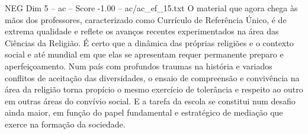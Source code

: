 \begin{textsample}{NEG Dim 5 – ac – Score -1.00 – ac/ac\_ef\_15.txt}
O material que agora chega às mãos dos professores, caracterizado como Currículo de Referência Único, é de extrema qualidade e reflete os avanços recentes experimentados na área das Ciências da Religião.
É certo que a dinâmica das próprias religiões e o contexto social e até mundial em que elas se apresentam requer permanente preparo e aperfeiçoamento.
Num país com profundos traumas na história e variados conflitos de aceitação das diversidades, o ensaio de compreensão e convivência na área da religião torna propício o mesmo exercício de tolerância e respeito ao outro em outras áreas do convívio social.
E a tarefa da escola se constitui num desafio ainda maior, em função do papel fundamental e estratégico de mediação que exerce na formação da sociedade.

\end{textsample}
